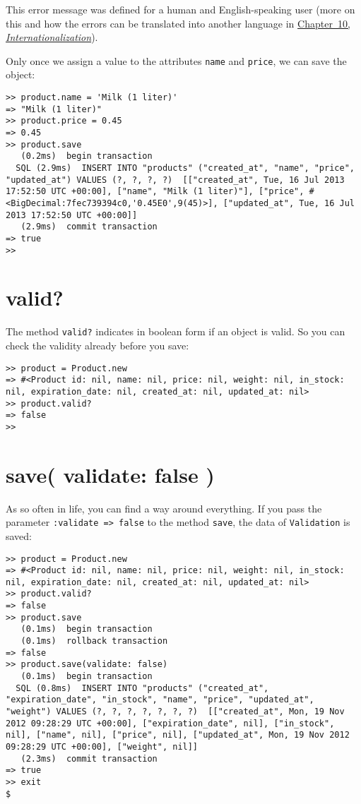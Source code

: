 \documentclass[a4paper]{book}
\newcommand{\chap}[1]{\newpage\thispagestyle{empty}\chapter{#1}\label{chap:\thechapter}}
\begin{document}
This error message was defined for a human and English-speaking user (more on this and how the errors can be translated into another language in \hyperref[i18n]{Chapter~10, \emph{Internationalization}}).

Only once we assign a value to the attributes \texttt{name} and \texttt{price}, we can save the object:

\begin{shaded}\begin{verbatim}
>> product.name = 'Milk (1 liter)'
=> "Milk (1 liter)"
>> product.price = 0.45
=> 0.45
>> product.save
   (0.2ms)  begin transaction
  SQL (2.9ms)  INSERT INTO "products" ("created_at", "name", "price", "updated_at") VALUES (?, ?, ?, ?)  [["created_at", Tue, 16 Jul 2013 17:52:50 UTC +00:00], ["name", "Milk (1 liter)"], ["price", #<BigDecimal:7fec739394c0,'0.45E0',9(45)>], ["updated_at", Tue, 16 Jul 2013 17:52:50 UTC +00:00]]
   (2.9ms)  commit transaction
=> true
>>
\end{verbatim}\end{shaded}

\chap{valid?}\label{valid}

The method \texttt{valid?} indicates in boolean form if an object is valid. So you can check the validity already before you save:

\begin{shaded}\begin{verbatim}
>> product = Product.new
=> #<Product id: nil, name: nil, price: nil, weight: nil, in_stock: nil, expiration_date: nil, created_at: nil, updated_at: nil>
>> product.valid?
=> false
>>
\end{verbatim}\end{shaded}

\chap{save( validate: false )}\label{save-validate-false}

As so often in life, you can find a way around everything. If you pass the parameter \texttt{:validate =\textgreater{} false} to the method \texttt{save}, the data of \texttt{Validation} is saved:

\begin{shaded}\begin{verbatim}
>> product = Product.new
=> #<Product id: nil, name: nil, price: nil, weight: nil, in_stock: nil, expiration_date: nil, created_at: nil, updated_at: nil>
>> product.valid?
=> false
>> product.save
   (0.1ms)  begin transaction
   (0.1ms)  rollback transaction
=> false
>> product.save(validate: false)
   (0.1ms)  begin transaction
  SQL (0.8ms)  INSERT INTO "products" ("created_at", "expiration_date", "in_stock", "name", "price", "updated_at", "weight") VALUES (?, ?, ?, ?, ?, ?, ?)  [["created_at", Mon, 19 Nov 2012 09:28:29 UTC +00:00], ["expiration_date", nil], ["in_stock", nil], ["name", nil], ["price", nil], ["updated_at", Mon, 19 Nov 2012 09:28:29 UTC +00:00], ["weight", nil]]
   (2.3ms)  commit transaction
=> true
>> exit
$
\end{verbatim}\end{shaded}
\end{document}
